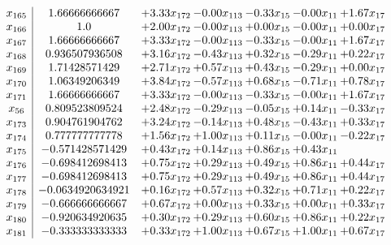\documentclass[8pt]{article}
\begin{document}
\[\begin{array}{c| c c@{\hskip 2pt} c@{\hskip 2pt} c@{\hskip 2pt} c@{\hskip 2pt} c@{\hskip 2pt} }
 x_{165}   &  1.66666666667 & +  3.33 x_{172} & -0.00 x_{113} & -0.33 x_{15} & -0.00 x_{11} & +  1.67 x_{17}\\
 x_{166}   &  1.0 & +  2.00 x_{172} & -0.00 x_{113} & +  0.00 x_{15} & -0.00 x_{11} & +  0.00 x_{17}\\
 x_{167}   &  1.66666666667 & +  3.33 x_{172} & -0.00 x_{113} & -0.33 x_{15} & -0.00 x_{11} & +  1.67 x_{17}\\
 x_{168}   &  0.936507936508 & +  3.16 x_{172} & -0.43 x_{113} & +  0.32 x_{15} & -0.29 x_{11} & +  0.22 x_{17}\\
 x_{169}   &  1.71428571429 & +  2.71 x_{172} & +  0.57 x_{113} & +  0.43 x_{15} & -0.29 x_{11} & +  0.00 x_{17}\\
 x_{170}   &  1.06349206349 & +  3.84 x_{172} & -0.57 x_{113} & +  0.68 x_{15} & -0.71 x_{11} & +  0.78 x_{17}\\
 x_{171}   &  1.66666666667 & +  3.33 x_{172} & -0.00 x_{113} & -0.33 x_{15} & -0.00 x_{11} & +  1.67 x_{17}\\
 x_{56}   &  0.809523809524 & +  2.48 x_{172} & -0.29 x_{113} & -0.05 x_{15} & +  0.14 x_{11} & -0.33 x_{17}\\
 x_{173}   &  0.904761904762 & +  3.24 x_{172} & -0.14 x_{113} & +  0.48 x_{15} & -0.43 x_{11} & +  0.33 x_{17}\\
 x_{174}   &  0.777777777778 & +  1.56 x_{172} & +  1.00 x_{113} & +  0.11 x_{15} & -0.00 x_{11} & -0.22 x_{17}\\
 x_{175}   &  -0.571428571429 & +  0.43 x_{172} & +  0.14 x_{113} & +  0.86 x_{15} & +  0.43 x_{11} &   \\
 x_{176}   &  -0.698412698413 & +  0.75 x_{172} & +  0.29 x_{113} & +  0.49 x_{15} & +  0.86 x_{11} & +  0.44 x_{17}\\
 x_{177}   &  -0.698412698413 & +  0.75 x_{172} & +  0.29 x_{113} & +  0.49 x_{15} & +  0.86 x_{11} & +  0.44 x_{17}\\
 x_{178}   &  -0.0634920634921 & +  0.16 x_{172} & +  0.57 x_{113} & +  0.32 x_{15} & +  0.71 x_{11} & +  0.22 x_{17}\\
 x_{179}   &  -0.666666666667 & +  0.67 x_{172} & +  0.00 x_{113} & +  0.33 x_{15} & +  0.00 x_{11} & +  0.33 x_{17}\\
 x_{180}   &  -0.920634920635 & +  0.30 x_{172} & +  0.29 x_{113} & +  0.60 x_{15} & +  0.86 x_{11} & +  0.22 x_{17}\\
 x_{181}   &  -0.333333333333 & +  0.33 x_{172} & +  1.00 x_{113} & +  0.67 x_{15} & +  1.00 x_{11} & +  0.67 x_{17}\\

\end{array}\]
\end{document}
